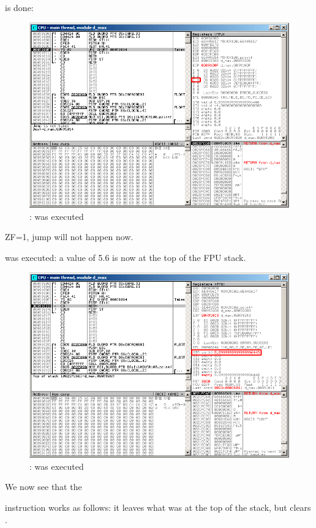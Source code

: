 \clearpage
\TEST is done:

\begin{figure}[H]
\centering
\includegraphics[scale=\FigScale]{patterns/12_FPU/3_comparison/x86/MSVC_Ox/olly2_4.png}
\caption{\olly: \TEST was executed}
\label{fig:FPU_comparison_Ox_case2_olly4}
\end{figure}

ZF=1, jump will not happen now.

\clearpage
\FSTP {} was executed: a value of 5.6 is now at the top of the FPU stack.

\begin{figure}[H]
\centering
\includegraphics[scale=\FigScale]{patterns/12_FPU/3_comparison/x86/MSVC_Ox/olly2_5.png}
\caption{\olly: \FSTP was executed}
\label{fig:FPU_comparison_Ox_case2_olly5}
\end{figure}

We now see that the \FSTP {} 

instruction works as follows: it leaves what was at the top of the stack, but clears .

